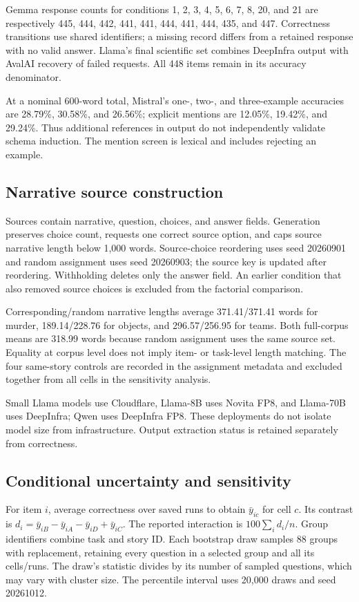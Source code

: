 Gemma response counts for conditions 1, 2, 3, 4, 5, 6, 7, 8, 20, and 21 are respectively 445, 444, 442, 441, 441, 444, 441, 444, 435, and 447. Correctness transitions use shared identifiers; a missing record differs from a retained response with no valid answer. Llama's final scientific set combines DeepInfra output with AvalAI recovery of failed requests. All 448 items remain in its accuracy denominator.

At a nominal 600-word total, Mistral's one-, two-, and three-example accuracies are 28.79\%, 30.58\%, and 26.56\%; explicit mentions are 12.05\%, 19.42\%, and 29.24\%. Thus additional references in output do not independently validate schema induction. The mention screen is lexical and includes rejecting an example.

\subsection{Narrative source construction}
Sources contain narrative, question, choices, and answer fields. Generation preserves choice count, requests one correct source option, and caps source narrative length below 1,000 words. Source-choice reordering uses seed 20260901 and random assignment uses seed 20260903; the source key is updated after reordering. Withholding deletes only the answer field. An earlier condition that also removed source choices is excluded from the factorial comparison.

Corresponding/random narrative lengths average 371.41/371.41 words for murder, 189.14/228.76 for objects, and 296.57/256.95 for teams. Both full-corpus means are 318.99 words because random assignment uses the same source set. Equality at corpus level does not imply item- or task-level length matching. The four same-story controls are recorded in the assignment metadata and excluded together from all cells in the sensitivity analysis.

Small Llama models use Cloudflare, Llama-8B uses Novita FP8, and Llama-70B uses DeepInfra; Qwen uses DeepInfra FP8. These deployments do not isolate model size from infrastructure. Output extraction status is retained separately from correctness.

\subsection{Conditional uncertainty and sensitivity}
\label{app:sensitivity}
For item $i$, average correctness over saved runs to obtain $\bar y_{ic}$ for cell $c$. Its contrast is $d_i=\bar y_{iB}-\bar y_{iA}-\bar y_{iD}+\bar y_{iC}$. The reported interaction is $100\sum_i d_i/n$. Group identifiers combine task and story ID. Each bootstrap draw samples 88 groups with replacement, retaining every question in a selected group and all its cells/runs. The draw's statistic divides by its number of sampled questions, which may vary with cluster size. The percentile interval uses 20,000 draws and seed 20261012.


